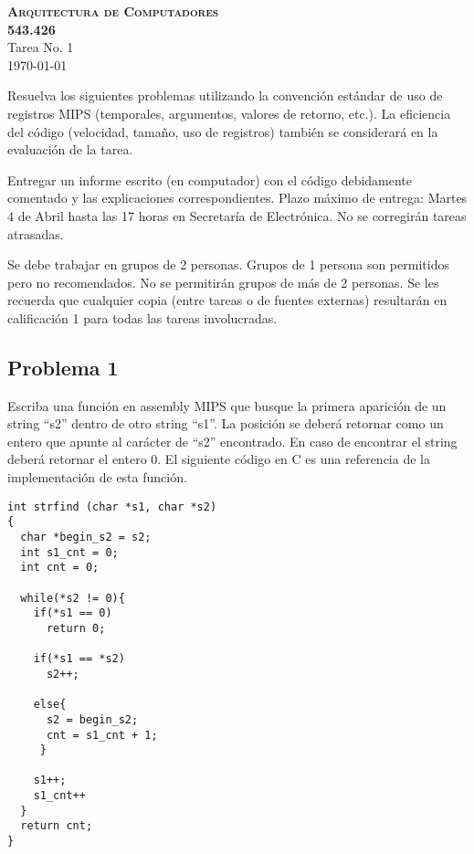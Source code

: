 \documentclass[letterpaper,11pt,notitlepage]{article}
\begin{document}

\begin{center}
\textsc{ \huge \bfseries Arquitectura de Computadores\\[0.2cm] 543.426}\\[0.2cm]
Tarea No. 1\\

\today

\end{center}




Resuelva los siguientes problemas utilizando la convención estándar de uso de registros MIPS (temporales, argumentos, valores de retorno, etc.). La eficiencia del código (velocidad, tamaño, uso de registros) también se considerará en la evaluación de la tarea.

Entregar un informe escrito (en computador) con el código debidamente comentado y las explicaciones correspondientes. Plazo máximo de entrega: Martes 4 de Abril hasta las 17 horas en Secretaría de Electrónica. No se corregirán tareas atrasadas.

Se debe trabajar en grupos de 2 personas. Grupos de 1 persona son permitidos pero no recomendados. No se permitirán grupos de más de 2 personas. Se les recuerda que cualquier copia (entre tareas o de fuentes externas) resultarán en calificación 1 para todas las tareas involucradas.


\subsection*{Problema 1}

Escriba una función en assembly MIPS que busque la primera aparición de un string ``s2'' dentro de otro string ``s1''. La posición se deberá retornar como un entero que apunte al carácter de ``s2'' encontrado. En caso de encontrar el string deberá retornar el entero 0. El siguiente código en C es una referencia de la implementación de esta función.

\begin{lstlisting}[style=C]
int strfind (char *s1, char *s2)
{
  char *begin_s2 = s2;
  int s1_cnt = 0;
  int cnt = 0;
  
  while(*s2 != 0){
    if(*s1 == 0)
      return 0;

    if(*s1 == *s2)
      s2++;

    else{
      s2 = begin_s2;
      cnt = s1_cnt + 1;
     }

    s1++;
    s1_cnt++
  }
  return cnt;
}
\end{lstlisting} 
\end{document}
